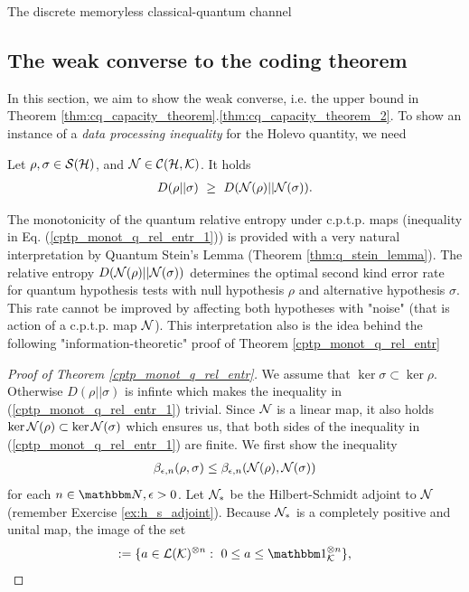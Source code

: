 \begin{section}{The discrete memoryless  classical-quantum channel}
	\subsection{The weak converse to the coding theorem}
	In this section, we aim to show the weak converse, i.e. the upper bound in Theorem \ref{thm:cq_capacity_theorem}.\ref{thm:cq_capacity_theorem_2}. To show an instance of a \emph{data processing inequality} for the Holevo quantity, we need 
	\begin{theorem}\label{cptp_monot_q_rel_entr}
		Let $\rho, \sigma \in{\mathcal S}({\mathcal H})$, and ${\mathcal N} \in {\mathcal C}({\mathcal H},{\mathcal K})$. It holds
		\begin{align}
		D(\rho||\sigma) \ \geq \ D({\mathcal N}(\rho)|| {\mathcal N}(\sigma)). \label{cptp_monot_q_rel_entr_1}
		\end{align}
	\end{theorem}
	The monotonicity of the quantum relative entropy under c.p.t.p. maps (inequality in Eq. (\ref{cptp_monot_q_rel_entr_1})) is provided with a very natural interpretation by Quantum Stein's Lemma (Theorem \ref{thm:q_stein_lemma}). 
	The relative entropy $D({\mathcal N}(\rho)|| {\mathcal N}(\sigma))$ determines the optimal second kind error rate for quantum hypothesis tests with null hypothesis $\rho$ and alternative hypothesis $\sigma$. This rate cannot be improved by affecting both hypotheses with "noise" (that is action of a c.p.t.p. map ${\mathcal N}$). This interpretation also is the idea behind the following "information-theoretic" proof of Theorem \ref{cptp_monot_q_rel_entr}
	\begin{proof}[Proof of Theorem \ref{cptp_monot_q_rel_entr}]
		We assume that $\ker \sigma \subset \ker \rho$. Otherwise $D(\rho||\sigma)$ is infinte which makes the inequality in (\ref{cptp_monot_q_rel_entr_1}) trivial. Since ${\mathcal N}$ is a linear map, it also holds 
		$\ker {\mathcal N}(\rho) \subset \ker {\mathcal N}(\sigma)$ which ensures us, that both sides of the inequality in (\ref{cptp_monot_q_rel_entr_1}) are finite. \newline 
		We first show the inequality 
		\begin{align}
		\beta_{\epsilon, n } (\rho, \sigma) \leq \beta_{\epsilon, n } ({\mathcal N}(\rho), {\mathcal N}(\sigma))
		\end{align}
		for each $n \in \bbmN, \epsilon > 0$. 
		Let ${\mathcal N}_\ast$ be the Hilbert-Schmidt adjoint  to ${\mathcal N}$ (remember Exercise \ref{ex:h_s_adjoint}). Because ${\mathcal N}_\ast$ is a completely positive and unital map, the image of the set
		\begin{align}
		[0,\bbmeins_\cK^{\otimes n}] := \{a \in \cL(\cK)^{\otimes n}: \ 0 \leq a \leq \bbmeins_{\cK}^{\otimes n} \},

\end{align}
\end{proof}
\end{section}
